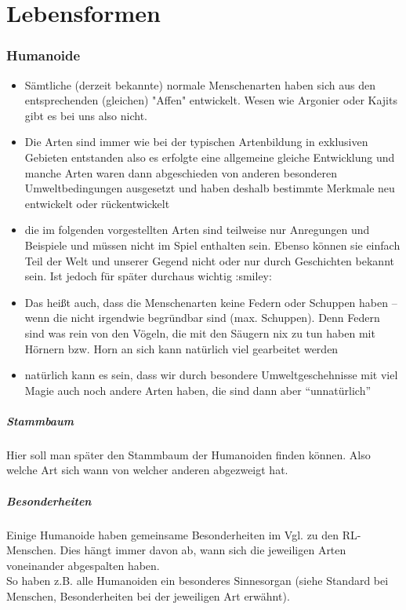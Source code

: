 \chapter{Lebensformen}
\subsection{Humanoide}
\begin{itemize}
	\item Sämtliche (derzeit bekannte) normale Menschenarten haben sich aus den entsprechenden (gleichen) "Affen" entwickelt. Wesen wie Argonier oder Kajits gibt es bei uns also nicht.
	\item Die Arten sind immer wie bei der typischen Artenbildung in exklusiven Gebieten entstanden
	also es erfolgte eine allgemeine gleiche Entwicklung und manche Arten waren dann abgeschieden von anderen besonderen Umweltbedingungen ausgesetzt und haben deshalb bestimmte Merkmale neu entwickelt oder rückentwickelt
	\item die im folgenden vorgestellten Arten sind teilweise nur Anregungen und Beispiele und müssen nicht im Spiel enthalten sein. Ebenso können sie einfach Teil der Welt und unserer Gegend nicht oder nur durch Geschichten bekannt sein. Ist jedoch für später durchaus wichtig :smiley:
	\item Das heißt auch, dass die Menschenarten keine Federn oder Schuppen haben -- wenn die nicht irgendwie begründbar sind (max. Schuppen). Denn Federn sind was rein von den Vögeln, die mit den Säugern nix zu tun haben
	mit Hörnern bzw. Horn an sich kann natürlich viel gearbeitet werden
	\item natürlich kann es sein, dass wir durch besondere Umweltgeschehnisse mit viel Magie auch noch andere Arten haben, die sind dann aber "`unnatürlich"'
\end{itemize}

\paragraph{Stammbaum} Hier soll man später den Stammbaum der Humanoiden finden können. Also welche Art sich wann von welcher anderen abgezweigt hat.

\paragraph{Besonderheiten}
Einige Humanoide haben gemeinsame Besonderheiten im Vgl. zu den RL-Menschen. Dies hängt immer davon ab, wann sich die jeweiligen Arten voneinander abgespalten haben. \\
So haben z.B. alle Humanoiden ein besonderes Sinnesorgan (siehe Standard bei Menschen, Besonderheiten bei der jeweiligen Art erwähnt).


